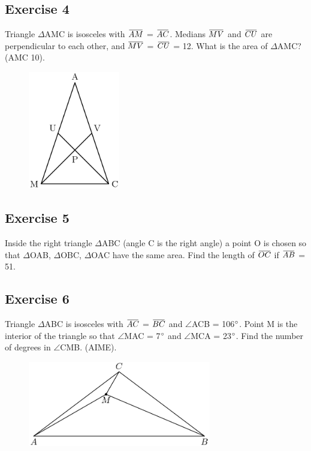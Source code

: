 \documentclass[12pt]{article}
\newcommand{\overbar}[1]{\mkern 1.5mu\overline{\mkern-1.5mu#1\mkern-1.5mu}\mkern 1.5mu}
\begin{document}
\subsection*{Exercise 4}
Triangle $\Delta$AMC is isosceles with  $\overbar{AM}$ =  $\overbar{AC}$. Medians $\overbar{MV}$ and $\overbar{CU}$ are perpendicular to each other, and $\overbar{MV}$ = $\overbar{CU}$ = 12. What is the area of $\Delta$AMC? (AMC 10).
\begin{figure}[htp]
    \includegraphics[width=4cm]{img2.png}
\end{figure}
\vspace{2in}

\subsection*{Exercise 5}
Inside the right triangle $\Delta$ABC (angle C is the right angle) a point O is chosen so that $\Delta$OAB, $\Delta$OBC, $\Delta$OAC have the same area. Find the length of $\overbar{OC}$ if $\overbar{AB}$ = 51.
\vspace{3in}

\subsection*{Exercise 6}
Triangle $\Delta$ABC is isosceles with $\overbar{AC}$ = $\overbar{BC}$ and $\angle$ACB = 106$\degree$. Point M is the interior of the triangle so that $\angle$MAC = 7$\degree$ and $\angle$MCA = 23$\degree$. Find the number of degrees in $\angle$CMB. (AIME).
\begin{figure}[htp]
    \includegraphics[width=8cm]{img4.png}
\end{figure}
\vspace{2in}
\end{document}
